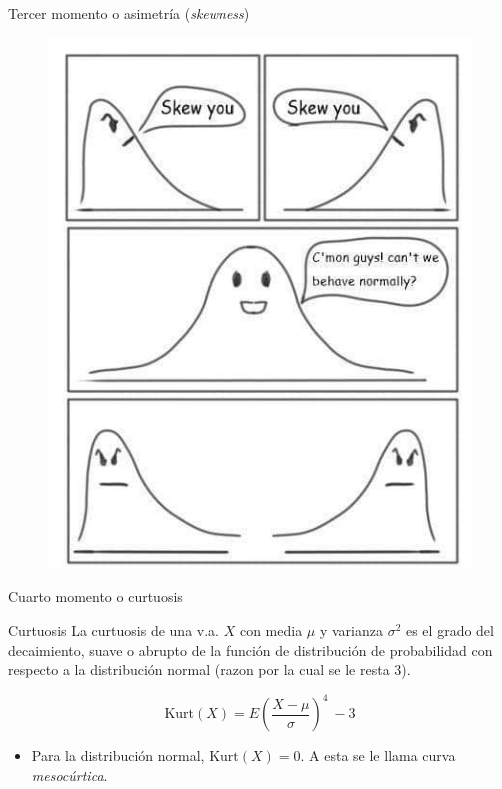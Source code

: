 \documentclass{beamer}
\begin{document}
\begin{frame}{Tercer momento o asimetría (\textit{skewness})}
  \begin{figure}[h!]
    \centering
    \includegraphics[scale=0.4]{figures/joke.jpeg}
  \end{figure}
\end{frame}

\begin{frame}{Cuarto momento o curtuosis}

  \begin{block}{Curtuosis}
  La curtuosis de una v.a. $X$ con media $\mu$ y varianza $\sigma^2$ es el grado
del decaimiento, suave o abrupto de la función de distribución de probabilidad
con respecto a la distribución normal (razon por la cual se le resta 3).

\begin{equation}
  \text{Kurt}(X) = E(\frac{X-\mu}{\sigma})^4 \ -3
\end{equation}
\end{block}

\begin{block}{}
  \begin{itemize}
    \item Para la distribución normal, $\text{Kurt}(X)=0$. A esta se le llama curva
          \textit{mesocúrtica}.
  \end{itemize}
\end{block}

\end{frame}
\end{document}
